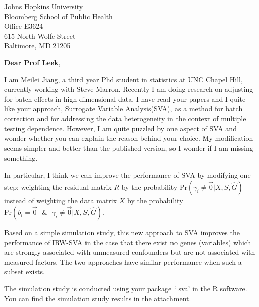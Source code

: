 \documentclass{letter}
\begin{document}

\begin{letter}{Johns Hopkins University \\
                     Bloomberg School of Public Health \\ 
                     Office E3624 \\ 
                     615 North Wolfe Street  \\ 
                     Baltimore, MD 21205} %


\opening{\textbf{Dear Prof Leek},}
 
I am Meilei Jiang, a third year Phd student in statistics at UNC Chapel Hill, currently working with Steve Marron. Recently I am doing research on adjusting for batch effects in high dimensional data. I have read your papers and I quite like your approach, Surrogate Variable Analysis(SVA), as a method for batch correction and for addressing the data heterogeneity in the context of multiple testing dependence. However, I am quite puzzled by one aspect of SVA and wonder whether you can explain the reason behind your choice. My modification seems simpler and better than the published version, so I wonder if I am missing something.

In particular, I think we can improve the performance of SVA by modifying one step: weighting the residual matrix $R$ by the probability $\text{Pr}( \gamma_i \neq \vec{0}| X, S, \hat{G})$ instead of weighting the data matrix $X$ by the probability $\text{Pr}(b_i = \vec{0} \text{ } \& \text{ } \gamma_i \neq \vec{0} | X, S, \hat{G})$.

Based on a simple simulation study, this new approach to SVA improves the performance of IRW-SVA in the case that there exist no genes (variables) which are strongly associated with unmeasured confounders but are not associated with measured factors. The two approaches have similar performance when such a subset exists. 

The simulation study is conducted using your package `
sva' in the R software. You can find the simulation study results in the attachment.



\end{letter}
\end{document}
